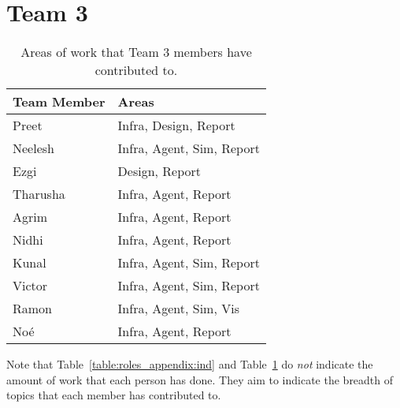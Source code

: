 \section{Team 3}
\label{sec:roles_appendix:team3}

\begin{table}[H]
    \centering
    \begin{tabular}{|l|l|}
    \hline
    \textbf{Team Member} & \textbf{Areas}     \\ \hline
    Preet  & Infra, Design, Report         \\
    Neelesh  & Infra, Agent, Sim, Report                 \\
    Ezgi     & Design, Report        \\
    Tharusha     & Infra, Agent, Report \\
    Agrim    & Infra, Agent, Report                      \\
    Nidhi  & Infra, Agent, Report                        \\
    Kunal    & Infra, Agent, Sim, Report  \\
    Victor & Infra, Agent, Sim, Report  \\ 
    Ramon &  Infra, Agent, Sim, Vis \\
    Noé &   Infra, Agent, Report \\   \hline
\end{tabular}
\caption{Areas of work that Team 3 members have contributed to.}
\label{sec:roles_appendix:team1}
\end{table}



Note that Table~\ref{table:roles_appendix:ind} and Table~\ref{sec:roles_appendix:team3} do \emph{not} indicate the amount of work that each person has done. They aim to indicate the breadth of topics that each member has contributed to. 